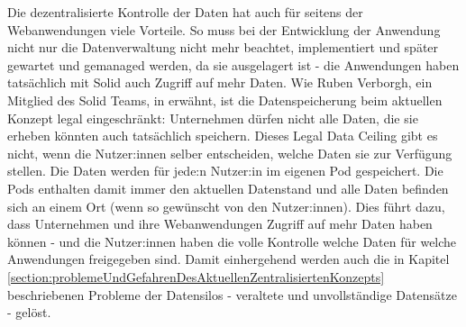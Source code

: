 \documentclass[acmtog]{acmart}
\begin{document}
Die dezentralisierte Kontrolle der Daten hat auch für seitens der Webanwendungen viele Vorteile. So muss bei der Entwicklung der Anwendung nicht nur die Datenverwaltung nicht mehr beachtet, implementiert und später gewartet und gemanaged werden, da sie ausgelagert ist - die Anwendungen haben tatsächlich mit Solid auch Zugriff auf mehr Daten. Wie Ruben Verborgh, ein Mitglied des Solid Teams, in \cite{MarcoNeumann.2021} erwähnt, ist die Datenspeicherung beim aktuellen Konzept legal eingeschränkt: Unternehmen dürfen nicht alle Daten, die sie erheben könnten auch tatsächlich speichern. Dieses Legal Data Ceiling gibt es nicht, wenn die Nutzer:innen selber entscheiden, welche Daten sie zur Verfügung stellen. Die Daten werden für jede:n Nutzer:in im eigenen Pod gespeichert. Die Pods enthalten damit immer den aktuellen Datenstand und alle Daten befinden sich an einem Ort (wenn so gewünscht von den Nutzer:innen). Dies führt dazu, dass Unternehmen und ihre Webanwendungen Zugriff auf mehr Daten haben können - und die Nutzer:innen haben die volle Kontrolle welche Daten für welche Anwendungen freigegeben sind. Damit einhergehend werden auch die in Kapitel \ref{section:problemeUndGefahrenDesAktuellenZentralisiertenKonzepts} beschriebenen Probleme der Datensilos - veraltete und unvollständige Datensätze - gelöst.
\end{document}
